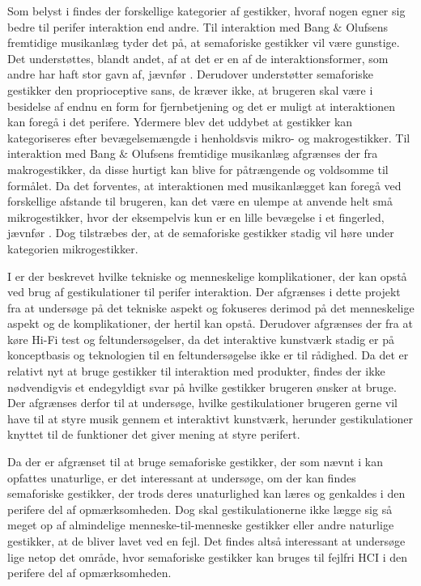 Som belyst i  findes der forskellige kategorier af gestikker, hvoraf nogen egner sig bedre til perifer interaktion end andre. Til interaktion med Bang $\&$ Olufsens fremtidige musikanlæg tyder det på, at semaforiske gestikker vil være gunstige. Det understøttes, blandt andet, af at det er en af de interaktionsformer, som andre har haft stor gavn af, jævnfør . Derudover understøtter semaforiske gestikker den proprioceptive sans, de kræver ikke, at brugeren skal være i besidelse af endnu en form for fjernbetjening og det er muligt at interaktionen kan foregå i det perifere. Ydermere blev det uddybet at gestikker kan kategoriseres efter bevægelsemængde i henholdsvis mikro- og makrogestikker. Til interaktion med Bang $\&$ Olufsens fremtidige musikanlæg afgrænses der fra makrogestikker, da disse hurtigt kan blive for påtrængende og voldsomme til formålet. Da det forventes, at interaktionen med musikanlægget kan foregå ved forskellige afstande til brugeren, kan det være en ulempe at anvende helt små mikrogestikker, hvor der eksempelvis kun er en lille bevægelse i et fingerled, jævnfør . Dog tilstræbes der, at de semaforiske gestikker stadig vil høre under kategorien mikrogestikker.\blankline
%






I  er der beskrevet hvilke tekniske og menneskelige komplikationer, der kan opstå ved brug af gestikulationer til perifer interaktion. Der afgrænses i dette projekt fra at undersøge på det tekniske aspekt og fokuseres derimod på det menneskelige aspekt og de komplikationer, der hertil kan opstå. Derudover afgrænses der fra at køre Hi-Fi test og feltundersøgelser, da det interaktive kunstværk stadig er på konceptbasis og teknologien til en feltundersøgelse ikke er til rådighed. Da det er relativt nyt at bruge gestikker til interaktion med produkter, findes der ikke nødvendigvis et endegyldigt svar på hvilke gestikker brugeren ønsker at bruge. Der afgrænses derfor til at undersøge, hvilke gestikulationer brugeren gerne vil have til at styre musik gennem et interaktivt kunstværk, herunder gestikulationer knyttet til de funktioner det giver mening at styre perifert. 

Da der er afgrænset til at bruge semaforiske gestikker, der som nævnt i  kan opfattes unaturlige, er det interessant at undersøge, om der kan findes semaforiske gestikker, der trods deres unaturlighed kan læres og genkaldes i den perifere del af opmærksomheden. Dog skal gestikulationerne ikke lægge sig så meget op af almindelige menneske-til-menneske gestikker eller andre naturlige gestikker, at de bliver lavet ved en fejl. Det findes altså interessant at undersøge lige netop det område, hvor semaforiske gestikker kan bruges til fejlfri HCI i den perifere del af opmærksomheden. \\

